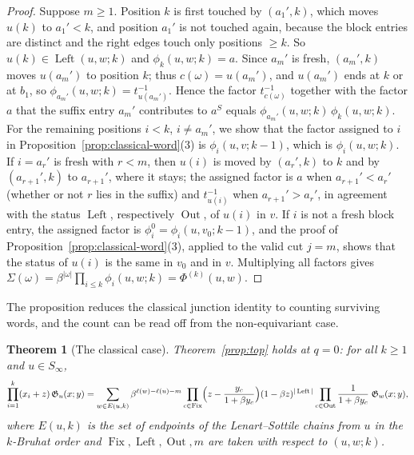\documentclass[11pt]{article}
\newtheorem{theorem}[proposition]{Theorem}
\newcommand{\G}{\mathfrak{G}}
\newcommand{\Fix}{\operatorname{Fix}}
\newcommand{\Left}{\operatorname{Left}}
\newcommand{\Out}{\operatorname{Out}}
\newcommand{\ellength}{\ell}
\begin{document}
\begin{proof}
Suppose $m\geq1$. Position $k$ is first touched by $(a_1',k)$, which
moves $u(k)$ to $a_1'<k$, and position $a_1'$ is not touched again,
because the block entries are distinct and the right edges touch only
positions $\geq k$. So $u(k)\in\Left(u,w;k)$ and $\phi_k(u,w;k)=a$.
Since $a_m'$ is fresh, $(a_m',k)$ moves $u(a_m')$ to position $k$;
thus $c(\omega)=u(a_m')$, and $u(a_m')$ ends at $k$ or at $b_1$, so
$\phi_{a_m'}(u,w;k)=t_{u(a_m')}^{-1}$. Hence the factor
$t_{c(\omega)}^{-1}$ together with the factor $a$ that the suffix
entry $a_m'$ contributes to $a^S$ equals
$\phi_{a_m'}(u,w;k)\,\phi_k(u,w;k)$. For the remaining positions
$i<k$, $i\neq a_m'$, we show that the factor assigned to $i$ in
Proposition~\ref{prop:classical-word}(3) is $\phi_i(u,v;k-1)$, which
is $\phi_i(u,w;k)$. If $i=a_r'$ is fresh with $r<m$, then $u(i)$ is
moved by $(a_r',k)$ to $k$ and by $(a_{r+1}',k)$ to $a_{r+1}'$, where it
stays; the assigned factor is $a$ when $a_{r+1}'<a_r'$ (whether or not
$r$ lies in the suffix) and $t_{u(i)}^{-1}$ when $a_{r+1}'>a_r'$, in
agreement with the status $\Left$, respectively $\Out$, of $u(i)$ in
$v$. If $i$ is not a fresh block entry, the assigned factor is
$\phi_i^0=\phi_i(u,v_0;k-1)$, and the proof of
Proposition~\ref{prop:classical-word}(3), applied to the valid cut
$j=m$, shows that the status of $u(i)$ is the same in $v_0$ and in $v$.
Multiplying all factors gives
$\Sigma(\omega)=\beta^{|\omega|}\prod_{i\leq k}\phi_i(u,w;k)
=\Phi^{(k)}(u,w)$.
\end{proof}

The proposition reduces the classical junction identity to counting
surviving words, and the count can be read off from the
non-equivariant case.

\begin{theorem}[The classical case]\label{thm:classical}
Theorem~\ref{prop:top} holds at $q=0$: for all $k\geq1$ and
$u\in S_\infty$,
\[
 \prod_{i=1}^k(x_i+z)\,\G_u(x;y)
 =\sum_{w\in E(u,k)}
   \beta^{\ellength(w)-\ellength(u)-m}
   \prod_{c\in\Fix}\Bigl(z-\frac{y_c}{1+\beta y_c}\Bigr)
   (1-\beta z)^{|\Left|}
   \prod_{c\in\Out}\frac1{1+\beta y_c}\;\G_w(x;y),
\]
where $E(u,k)$ is the set of endpoints of the Lenart--Sottile chains
from $u$ in the $k$-Bruhat order and $\Fix,\Left,\Out,m$ are taken
with respect to $(u,w;k)$.
\end{theorem}
\end{document}
